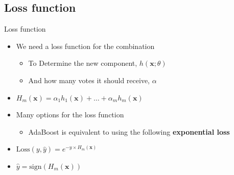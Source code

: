 \documentclass[serif, aspectratio=169]{beamer}
\begin{document}
\subsection{Loss function}

\begin{frame}{Loss function}
    \begin{itemize}
        \itemsep1em
        \justifying
        \item We need a loss function for the combination
        \begin{itemize}
            \itemsep0.25em
            \item To Determine the new component, $h(\boldsymbol{x};\theta)$
            \item And how many votes it should receive, $\alpha$
        \end{itemize}
        \item[] \begin{center}
            $H_m(\boldsymbol{x})=\alpha_1h_1(\boldsymbol{x})+\dots+\alpha_mh_m(\boldsymbol{x})$
        \end{center}
        \item Many options for the loss function
        \begin{itemize}
            \item AdaBoost is equivalent to using the following \textbf{exponential loss}
        \end{itemize}
        \item[] \begin{center}
            $\text{Loss}(y,\hat{y})=e^{-y \times H_m(\boldsymbol{x})}$
        \end{center}
        \item[] \begin{center}
            $\hat{y}=\text{sign}(H_m(\boldsymbol{x}))$
        \end{center}
    \end{itemize}
\end{frame}
\end{document}
